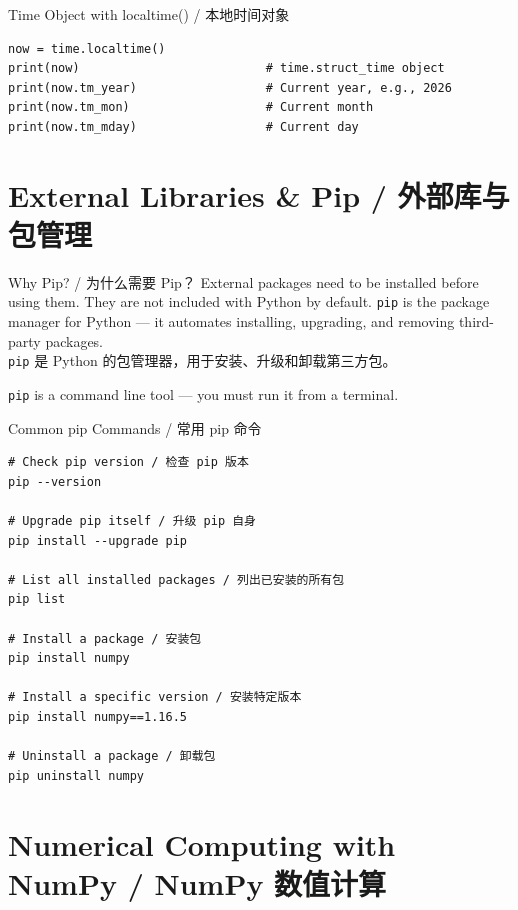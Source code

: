 \documentclass[11pt,a4paper]{article}
\begin{document}
\begin{examplebox}{Time Object with localtime() / 本地时间对象}
\begin{lstlisting}
now = time.localtime()
print(now)                          # time.struct_time object
print(now.tm_year)                  # Current year, e.g., 2026
print(now.tm_mon)                   # Current month
print(now.tm_mday)                  # Current day
\end{lstlisting}
\end{examplebox}

\section{External Libraries \& Pip / 外部库与包管理}

\begin{concept}{Why Pip? / 为什么需要 Pip？}
    External packages need to be installed before using them. They are not included with Python by default. \texttt{pip} is the package manager for Python — it automates installing, upgrading, and removing third-party packages. \\
    \texttt{pip} 是 Python 的包管理器，用于安装、升级和卸载第三方包。

    \texttt{pip} is a command line tool — you must run it from a terminal.
\end{concept}

\begin{examplebox}{Common pip Commands / 常用 pip 命令}
\begin{lstlisting}
# Check pip version / 检查 pip 版本
pip --version

# Upgrade pip itself / 升级 pip 自身
pip install --upgrade pip

# List all installed packages / 列出已安装的所有包
pip list

# Install a package / 安装包
pip install numpy

# Install a specific version / 安装特定版本
pip install numpy==1.16.5

# Uninstall a package / 卸载包
pip uninstall numpy
\end{lstlisting}
\end{examplebox}

\section{Numerical Computing with NumPy / NumPy 数值计算}
\end{document}
